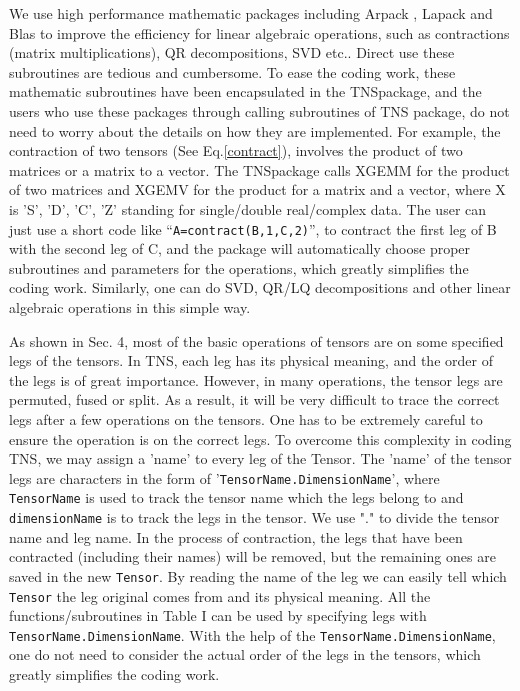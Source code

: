 \documentclass[preprint,3p,times,preprint,showpacs,amsmath,superscriptaddress,floatfix]{elsarticle}
\begin{document}
We use high performance mathematic packages including Arpack \cite{Arpack}, Lapack \cite{LapackAndBlas} and Blas \cite{LapackAndBlas}
to improve the efficiency for linear algebraic operations, such as contractions (matrix multiplications), QR decompositions, SVD etc..
Direct use these subroutines are tedious and cumbersome.
To ease the coding work, these mathematic subroutines have been encapsulated in the TNSpackage,
and the users who use these packages through calling subroutines of TNS package, do not need to worry about the details on how they are implemented.
For example, the contraction of two tensors (See Eq.\ref{contract}), involves the product of two matrices or a matrix to a vector.
The TNSpackage calls XGEMM for the product of two matrices and XGEMV for the product for a matrix and a vector, where X is 'S', 'D', 'C', 'Z' standing for single/double real/complex data. The user can just use a short code like ``{\tt A=contract(B,1,C,2)}'', to contract the first leg of B with the second
leg of C, and the package will automatically choose proper subroutines and parameters for the operations,
which greatly simplifies the coding work. Similarly, one can do SVD, QR/LQ decompositions and other linear algebraic operations
in this simple way.

As shown in Sec. 4, most of the basic operations of tensors are on some specified legs of the tensors. In TNS, each leg has its physical meaning, and the order of the legs is of great importance. However, in many operations, the tensor legs are permuted, fused or split.
As a result, it will be very difficult to trace the correct legs after a few operations on the tensors.
One has to be extremely careful to ensure the operation is on the correct legs.
%
To overcome this complexity in coding TNS, we may assign a 'name' to every leg of the Tensor. The 'name' of the tensor legs are characters in the form of '{\tt TensorName.DimensionName}', where {\tt TensorName} is used to track the tensor name which the legs belong to and {\tt dimensionName} is to track the legs
in the tensor. We use "." to divide the tensor name and leg name. In the process of contraction, the legs that have been contracted (including their names) will be removed, but the remaining ones are saved in the new {\tt Tensor}. By reading the name of the leg we can easily tell which {\tt Tensor} the leg original
comes from and its physical meaning. All the functions/subroutines in Table I can be used by specifying legs with {\tt TensorName.DimensionName}.
With the help of the {\tt TensorName.DimensionName}, one do not need to consider
the actual order of the legs in the tensors, which greatly simplifies the coding work.
\end{document}
